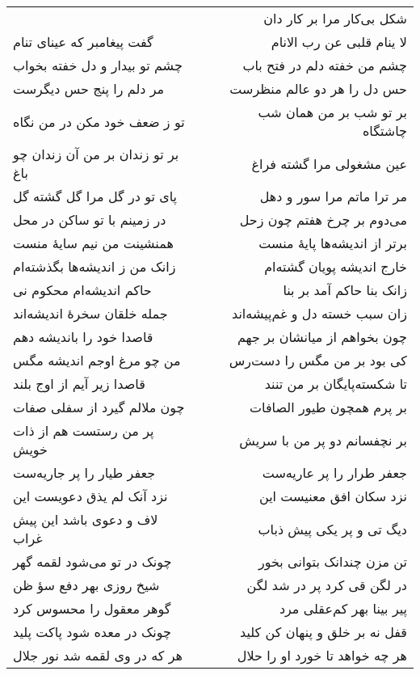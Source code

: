 \begin{center}
\begin{longtable}{l p{0.5cm} r}
&&
شکل بی‌کار مرا بر کار دان
\\
گفت پیغامبر که عینای تنام
&&
لا ینام قلبی عن رب الانام
\\
چشم تو بیدار و دل خفته بخواب
&&
چشم من خفته دلم در فتح باب
\\
مر دلم را پنج حس دیگرست
&&
حس دل را هر دو عالم منظرست
\\
تو ز ضعف خود مکن در من نگاه
&&
بر تو شب بر من همان شب چاشتگاه
\\
بر تو زندان بر من آن زندان چو باغ
&&
عین مشغولی مرا گشته فراغ
\\
پای تو در گل مرا گل گشته گل
&&
مر ترا ماتم مرا سور و دهل
\\
در زمینم با تو ساکن در محل
&&
می‌دوم بر چرخ هفتم چون زحل
\\
همنشینت من نیم سایهٔ منست
&&
برتر از اندیشه‌ها پایهٔ منست
\\
زانک من ز اندیشه‌ها بگذشته‌ام
&&
خارج اندیشه پویان گشته‌ام
\\
حاکم اندیشه‌ام محکوم نی
&&
زانک بنا حاکم آمد بر بنا
\\
جمله خلقان سخرهٔ اندیشه‌اند
&&
زان سبب خسته دل و غم‌پیشه‌اند
\\
قاصدا خود را باندیشه دهم
&&
چون بخواهم از میانشان بر جهم
\\
من چو مرغ اوجم اندیشه مگس
&&
کی بود بر من مگس را دست‌رس
\\
قاصدا زیر آیم از اوج بلند
&&
تا شکسته‌پایگان بر من تنند
\\
چون ملالم گیرد از سفلی صفات
&&
بر پرم همچون طیور الصافات
\\
پر من رستست هم از ذات خویش
&&
بر نچفسانم دو پر من با سریش
\\
جعفر طیار را پر جاریه‌ست
&&
جعفر طرار را پر عاریه‌ست
\\
نزد آنک لم یذق دعویست این
&&
نزد سکان افق معنیست این
\\
لاف و دعوی باشد این پیش غراب
&&
دیگ تی و پر یکی پیش ذباب
\\
چونک در تو می‌شود لقمه گهر
&&
تن مزن چندانک بتوانی بخور
\\
شیخ روزی بهر دفع سؤ ظن
&&
در لگن قی کرد پر در شد لگن
\\
گوهر معقول را محسوس کرد
&&
پیر بینا بهر کم‌عقلی مرد
\\
چونک در معده شود پاکت پلید
&&
قفل نه بر خلق و پنهان کن کلید
\\
هر که در وی لقمه شد نور جلال
&&
هر چه خواهد تا خورد او را حلال
\\
\end{longtable}
\end{center}
